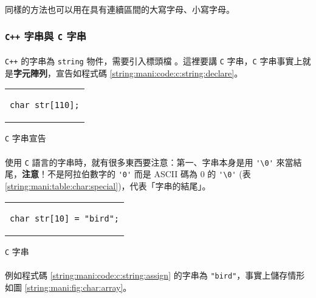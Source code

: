 \documentclass[12pt,a4paper,oneside]{article}
\begin{document}
\begin{CJK}{UTF8}{bkai}
\paragraph{}同樣的方法也可以用在具有連續區間的大寫字母、小寫字母。

\subsubsection{\texttt{C++} 字串與 \texttt{C} 字串}

\paragraph{}\texttt{C++} 的字串為 \lstinline!string! 物件，需要引入標頭檔 。這裡要講 \texttt{C} 字串，\texttt{C} 字串事實上就是{\color{red}\textbf{字元陣列}}，宣告如程式碼 \ref{string:mani:code:c:string:declare}。

\begin{code}[h!]
  \centering
  \begin{tabular}{c}
  \begin{lstlisting}
char str[110];
  \end{lstlisting}
  \end{tabular}
  \caption{\texttt{C} 字串宣告}
  \label{string:mani:code:c:string:declare}
\end{code}

\paragraph{}使用 \texttt{C} 語言的字串時，就有很多東西要注意：第一、字串本身是用 \lstinline!'\0'! 來當結尾，{\color{red}\textbf{注意}}！不是阿拉伯數字的 \lstinline!'0'! 而是 ASCII 碼為 0 的 \lstinline!'\0'! (表 \ref{string:mani:table:char:special})，代表「字串的結尾」。

\begin{code}[h!]
  \centering
  \begin{tabular}{c}
  \begin{lstlisting}
char str[10] = "bird";
  \end{lstlisting}
  \end{tabular}
  \caption{\texttt{C} 字串}
  \label{string:mani:code:c:string:assign}
\end{code}

\paragraph{}例如程式碼 \ref{string:mani:code:c:string:assign} 的字串為 \lstinline!"bird"!，事實上儲存情形如圖 \ref{string:mani:fig:char:array}。


\end{CJK}
\end{document}
